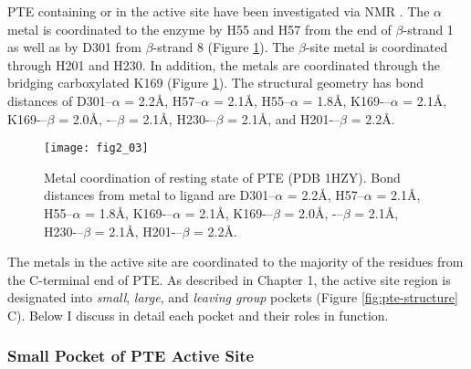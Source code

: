 \begin{refsection}
PTE containing  or  in the active site have been
investigated via NMR \cite{Benning2001a}. The $\alpha$ metal is coordinated to
the enzyme by H55 and H57 from the end of $\beta$-strand 1 as well as by D301
from $\beta$-strand 8 (Figure \ref{fig:pte-active-site-chap2}). The
$\beta$-site metal is coordinated through H201 and H230. In addition, the
metals are coordinated through the bridging carboxylated K169 (Figure
\ref{fig:pte-active-site-chap2}). The structural geometry has bond distances of
D301--$\alpha$ = 2.2\AA, H57--$\alpha$ = 2.1\AA, H55--$\alpha$ = 1.8\AA,
K169-–$\alpha$ = 2.1\AA, K169-–$\beta$ = 2.0\AA, -–$\beta$ = 2.1\AA,
H230-–$\beta$ = 2.1\AA, and H201-–$\beta$ = 2.2\AA\xspace \cite{Hanusa2011}.
\begin{figure}[htbp] 
    \centering 
    \texttt{[image: fig2\_03]}
    \caption[Metal
        coordination of resting state of PTE (PDB 1HZY). Bond distances from
        metal to ligand are D301--$\alpha$ = 2.2\AA, H57--$\alpha$ = 2.1\AA,
        H55--$\alpha$ = 1.8\AA, K169-–$\alpha$ = 2.1\AA, K169-–$\beta$ =
        2.0\AA, -–$\beta$ = 2.1\AA, H230-–$\beta$ = 2.1\AA,
    H201-–$\beta$ = 2.2\AA.]{Metal coordination of resting state of PTE (PDB
        1HZY). Bond distances from metal to ligand are D301--$\alpha$ = 2.2\AA,
        H57--$\alpha$ = 2.1\AA, H55--$\alpha$ = 1.8\AA, K169-–$\alpha$ =
        2.1\AA, K169-–$\beta$ = 2.0\AA,
        -–$\beta$ = 2.1\AA, H230-–$\beta$ = 2.1\AA, H201-–$\beta$ =
        2.2\AA\xspace \cite{Hanusa2011}.} \label{fig:pte-active-site-chap2}
\end{figure}

The metals in the active site are coordinated to the majority of the residues
from the C-terminal end of PTE. As described in Chapter 1, the active site
region is designated into \emph{small}, \emph{large}, and \emph{leaving group}
pockets (Figure \ref{fig:pte-structure} C). Below I discuss in detail each
pocket and their roles in function.

\subsubsection{Small Pocket of PTE Active Site}


\end{refsection}
